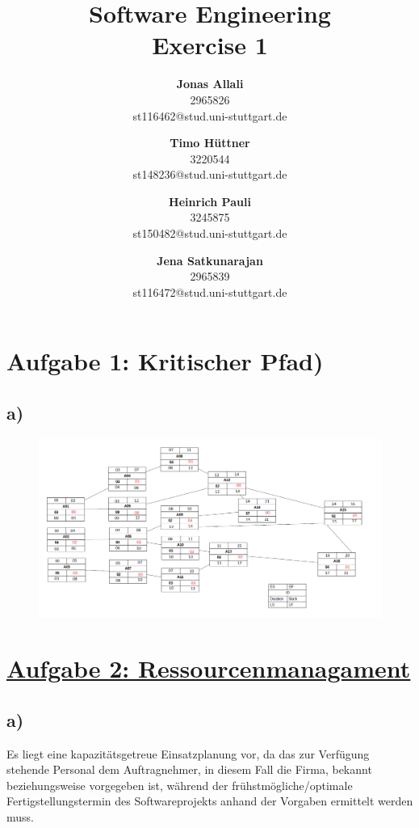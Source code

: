\documentclass[12pt,pdftex,a4paper]{article}
\title{\vspace{-1cm} Software Engineering \\ Exercise 1}
\author{\textbf{Jonas Allali}\\ 2965826\\st116462@stud.uni-stuttgart.de \and \textbf{Timo Hüttner}\\ 3220544\\ st148236@stud.uni-stuttgart.de \and \textbf{Heinrich Pauli}\\ 3245875\\st150482@stud.uni-stuttgart.de \and \textbf{Jena Satkunarajan}\\2965839\\st116472@stud.uni-stuttgart.de}
\date{}
\begin{document}
\setlength{\parindent}{0pt}
\maketitle
\thispagestyle{fancy}
\newpage


\section*{Aufgabe 1: Kritischer Pfad)}

\subsection*{a)}

\begin{figure}[htbp]
\centering
\includegraphics[width=1\textwidth]{1a.png}
\end{figure}

\section*{\underline{Aufgabe 2: Ressourcenmanagament}}
\subsection*{a)}
Es liegt eine kapazitätsgetreue Einsatzplanung vor, da das zur Verfügung stehende Personal dem Auftragnehmer, in diesem Fall die Firma, bekannt beziehungsweise vorgegeben ist, während der frühstmögliche/optimale Fertigstellungstermin des Softwareprojekts anhand der Vorgaben ermittelt werden muss.
\end{document}
